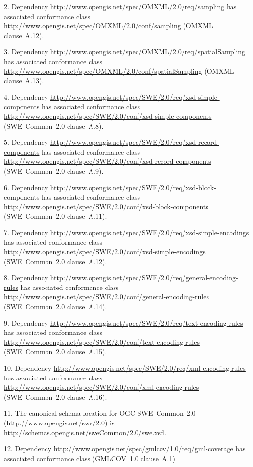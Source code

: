 2. Dependency \url{http://www.opengis.net/spec/OMXML/2.0/req/sampling} has associated conformance class \url{http://www.opengis.net/spec/OMXML/2.0/conf/sampling} (OMXML clause~A.12).

3. Dependency \url{http://www.opengis.net/spec/OMXML/2.0/req/spatialSampling} has associated conformance class \url{http://www.opengis.net/spec/OMXML/2.0/conf/spatialSampling} (OMXML clause~A.13).

4. Dependency \url{http://www.opengis.net/spec/SWE/2.0/req/xsd-simple-components} has associated conformance class \url{http://www.opengis.net/spec/SWE/2.0/conf/xsd-simple-components} (SWE~Common~2.0 clause~A.8).

5. Dependency \url{http://www.opengis.net/spec/SWE/2.0/req/xsd-record-components} has associated conformance class \url{http://www.opengis.net/spec/SWE/2.0/conf/xsd-record-components} (SWE~Common~2.0 clause~A.9).

6. Dependency \url{http://www.opengis.net/spec/SWE/2.0/req/xsd-block-components} has associated conformance class \url{http://www.opengis.net/spec/SWE/2.0/conf/xsd-block-components} (SWE~Common~2.0 clause~A.11).

7. Dependency \url{http://www.opengis.net/spec/SWE/2.0/req/xsd-simple-encodings} has associated conformance class \url{http://www.opengis.net/spec/SWE/2.0/conf/xsd-simple-encodings} (SWE~Common~2.0 clause~A.12).

8. Dependency \url{http://www.opengis.net/spec/SWE/2.0/req/general-encoding-rules} has associated conformance class \url{http://www.opengis.net/spec/SWE/2.0/conf/general-encoding-rules} (SWE~Common~2.0 clause~A.14).

9. Dependency \url{http://www.opengis.net/spec/SWE/2.0/req/text-encoding-rules} has associated conformance class \url{http://www.opengis.net/spec/SWE/2.0/conf/text-encoding-rules} (SWE~Common~2.0 clause~A.15).

10. Dependency \url{http://www.opengis.net/spec/SWE/2.0/req/xml-encoding-rules} has associated conformance class \url{http://www.opengis.net/spec/SWE/2.0/conf/xml-encoding-rules} (SWE~Common~2.0 clause~A.16).

11. The canonical schema location for OGC SWE~Common~2.0 (\url{http://www.opengis.net/swe/2.0}) is \url{http://schemas.opengis.net/sweCommon/2.0/swe.xsd}.

12. Dependency \url{http://www.opengis.net/spec/gmlcov/1.0/req/gml-coverage} has associated conformance class (GMLCOV~1.0 clause~A.1)

